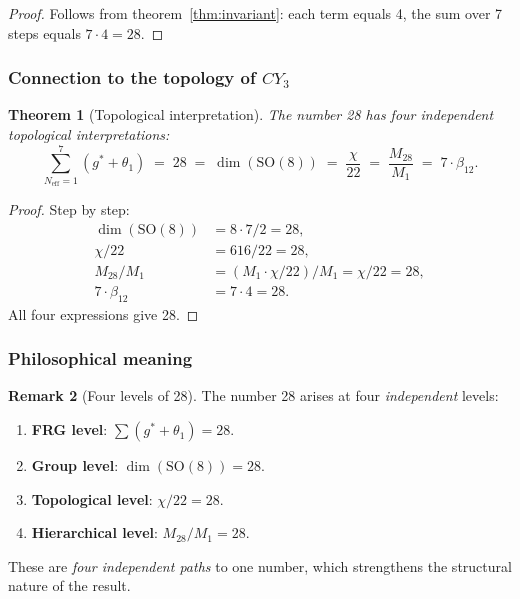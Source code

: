 \documentclass[11pt,a4paper]{article}
\newcommand{\SO}{\ensuremath{\mathrm{SO}}}
\newcommand{\CY}{\ensuremath{CY_3}}
\newtheorem{theorem}{Theorem}[section]
\theoremstyle{definition}
\newtheorem{remark}[theorem]{Remark}
\begin{document}
\begin{proof}
Follows from theorem~\ref{thm:invariant}: each term equals 4,
the sum over 7 steps equals $7 \cdot 4 = 28$.
\end{proof}

\subsubsection{Connection to the topology of \texorpdfstring{$\CY$}{}}

\begin{theorem}[Topological interpretation]
\label{thm:topology-link}
The number 28 has four independent topological interpretations:
\begin{equation}
    \boxed{
    \sum_{N_{\text{eff}} = 1}^{7} (g^* + \theta_1)
    \;=\; 28
    \;=\; \dim(\SO(8))
    \;=\; \frac{\chi}{22}
    \;=\; \frac{M_{28}}{M_1}
    \;=\; 7 \cdot \beta_{12}.
    }
    \label{eq:topology-link-main}
\end{equation}
\end{theorem}

\begin{proof}
Step by step:
\begin{align}
    \dim(\SO(8)) &= 8 \cdot 7 / 2 = 28, \\
    \chi / 22 &= 616 / 22 = 28, \\
    M_{28}/M_1 &= (M_1 \cdot \chi/22) / M_1 = \chi/22 = 28, \\
    7 \cdot \beta_{12} &= 7 \cdot 4 = 28.
\end{align}
All four expressions give 28.
\end{proof}

\subsubsection{Philosophical meaning}

\begin{remark}[Four levels of 28]
\label{rem:four-28}
The number 28 arises at four \emph{independent} levels:
\begin{enumerate}
    \item \textbf{FRG level}: $\sum(g^* + \theta_1) = 28$.
    \item \textbf{Group level}: $\dim(\SO(8)) = 28$.
    \item \textbf{Topological level}: $\chi/22 = 28$.
    \item \textbf{Hierarchical level}: $M_{28}/M_1 = 28$.
\end{enumerate}
These are \emph{four independent paths} to one number, which strengthens
the structural nature of the result.
\end{remark}
\end{document}

